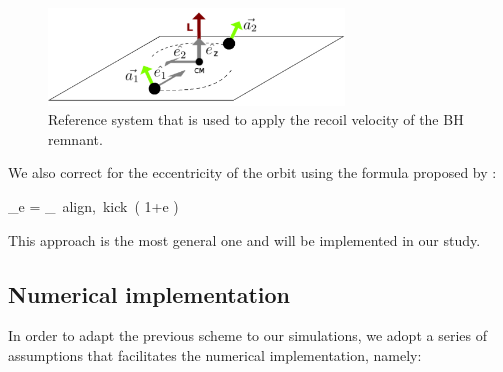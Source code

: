 \documentclass[a4,useAMS,usenatbib,usegraphicx,12pt]{article}
\begin{document}
\begin{figure}[htbp]
\centering
\includegraphics[width=0.7\textwidth]
{./figures/BinarySystem.png}
\caption{\small{Reference system that is used to apply the recoil velocity of the BH remnant.}}

\label{fig:RecoilReferenceSystem}
\end{figure}

We also correct for the eccentricity of the orbit using the formula proposed by \citep{Sopuerta2007}:

{ _{e} = _{\mbox{\tiny{ align, kick }}}( 1+e ) }

This approach is the most general one and will be implemented in our study.


\subsection{Numerical implementation}

In order to adapt the previous scheme to our simulations, we adopt a series of assumptions that 
facilitates the numerical implementation, namely:
\end{document}
